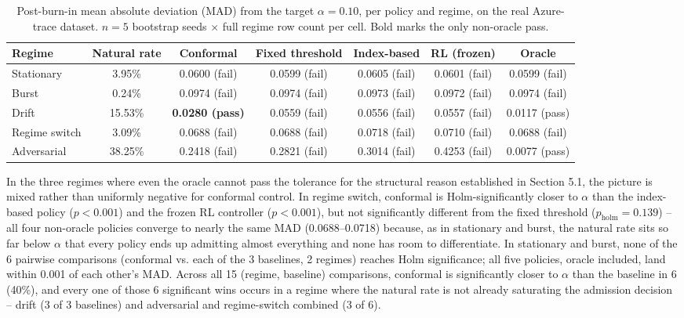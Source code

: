 \documentclass[11pt,letterpaper]{article}
\begin{document}
\begin{table}[!htbp]
\centering
\begin{tabular}{lcccccc}
\toprule
Regime & Natural rate & Conformal & Fixed threshold & Index-based & RL (frozen) & Oracle \\
\midrule
Stationary & 3.95\% & 0.0600 (fail) & 0.0599 (fail) & 0.0605 (fail) & 0.0601 (fail) & 0.0599 (fail) \\
Burst & 0.24\% & 0.0974 (fail) & 0.0974 (fail) & 0.0973 (fail) & 0.0972 (fail) & 0.0974 (fail) \\
Drift & 15.53\% & \textbf{0.0280 (pass)} & 0.0559 (fail) & 0.0556 (fail) & 0.0557 (fail) & 0.0117 (pass) \\
Regime switch & 3.09\% & 0.0688 (fail) & 0.0688 (fail) & 0.0718 (fail) & 0.0710 (fail) & 0.0688 (fail) \\
Adversarial & 38.25\% & 0.2418 (fail) & 0.2821 (fail) & 0.3014 (fail) & 0.4253 (fail) & 0.0077 (pass) \\
\bottomrule
\end{tabular}
\caption{Post-burn-in mean absolute deviation (MAD) from the target $\alpha = 0.10$, per policy and regime, on the real Azure-trace dataset. $n = 5$ bootstrap seeds $\times$ full regime row count per cell. Bold marks the only non-oracle pass.}
\label{tab:mad}
\end{table}

In the three regimes where even the oracle cannot pass the tolerance for the structural reason established in Section 5.1, the picture is mixed rather than uniformly negative for conformal control. In regime switch, conformal is Holm-significantly closer to $\alpha$ than the index-based policy ($p < 0.001$) and the frozen RL controller ($p < 0.001$), but not significantly different from the fixed threshold ($p_{\text{holm}} = 0.139$) -- all four non-oracle policies converge to nearly the same MAD (0.0688--0.0718) because, as in stationary and burst, the natural rate sits so far below $\alpha$ that every policy ends up admitting almost everything and none has room to differentiate. In stationary and burst, none of the 6 pairwise comparisons (conformal vs. each of the 3 baselines, 2 regimes) reaches Holm significance; all five policies, oracle included, land within 0.001 of each other's MAD. Across all 15 (regime, baseline) comparisons, conformal is significantly closer to $\alpha$ than the baseline in 6 (40\%), and every one of those 6 significant wins occurs in a regime where the natural rate is not already saturating the admission decision -- drift (3 of 3 baselines) and adversarial and regime-switch combined (3 of 6).
\end{document}
